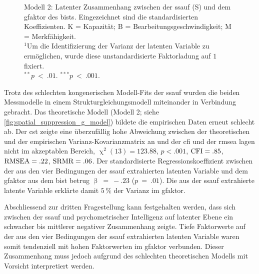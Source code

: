 \documentclass[11pt, twoside, a4paper]{book}		%
\begin{document}
\begin{figure}[htbp]
	
	\vspace{.2cm}
	\caption[Modell 2: Strukturgleichungsmodell zur Vorhersage des \gls{gfaktor}s durch die \gls{ssauf}]{Modell 2: Latenter Zusammenhang zwischen der \gls{ssauf} (\textsf{S}) und dem \gls{gfaktor} des \gls{bist}s. Eingezeichnet sind die standardisierten Koeffizienten. \textsf{K} = Kapazität; \textsf{B} = Bearbeitungsgeschwindigkeit; \textsf{M} = Merkfähigkeit.\\
	$^1$Um die Identifizierung der Varianz der latenten Variable zu ermöglichen, wurde diese unstandardisierte Faktorladung auf $1$ fixiert.\\
	$^{**}p~<~.01$. $^{***}p~<~.001$.}
	\label{fig:spatial_suppression_g_model}
\end{figure} 

Trotz des schlechten kongenerischen Modell-Fits der \gls{ssauf} wurden die beiden Messmodelle in einem Strukturgleichungsmodell miteinander in Verbindung gebracht. Das theoretische Modell (Modell 2; siehe \autoref{fig:spatial_suppression_g_model}) bildete die empirischen Daten erneut schlecht ab.  Der \gls{cst} zeigte eine überzufällig hohe Abweichung zwischen der theoretischen und der empirischen Var\-ianz-Ko\-var\-ianz\-ma\-trix an und der \gls{cfi} und der \gls{rmsea} lagen nicht im akzeptablen Bereich, $\upchi^2(13)=123.88$, $p<.001$, $\textnormal{CFI}=.85$, $\textnormal{RMSEA}=.22$, $\textnormal{SRMR}=.06$. 
Der standardisierte Regressionskoeffizient zwischen der aus den vier Bedingungen der \gls{ssauf} extrahierten latenten Variable und dem \gls{gfaktor} aus dem \gls{bist} betrug $\upbeta~=~-.23$ ($p~=~.01$).
Die aus der \gls{ssauf} extrahierte latente Variable erklärte damit $5\,\%$ der Varianz im \gls{gfaktor}.

Abschliessend zur dritten Fragestellung kann festgehalten werden, dass sich zwischen der \gls{ssauf} und psychometrischer Intelligenz auf latenter Ebene ein schwacher bis mittlerer negativer Zusammenhang zeigte.
Tiefe Faktorwerte auf der aus den vier Bedingungen der \gls{ssauf} extrahierten latenten Variable waren somit tendenziell mit hohen Faktorwerten im \gls{gfaktor} verbunden. Dieser Zusammenhang muss jedoch aufgrund des schlechten theoretischen Modells  mit Vorsicht interpretiert werden.
\end{document}
